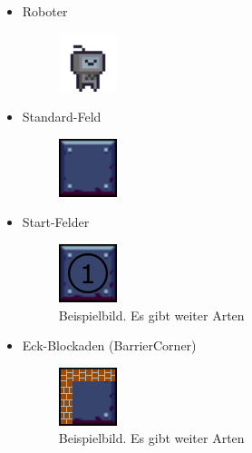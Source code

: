 \documentclass[12pt,a4paper,oneside]{book}
\theoremstyle{plain}
\numberwithin{equation}{chapter} \DeclareMathOperator{\Var}{Var}
\begin{document}
\begin{itemize}
    \item Roboter
    \begin{itemize}
        \begin{figure}[h]
            \centering
            \includegraphics{assets/robot.png}
            \label{StandardFeld}
        \end{figure}
    \end{itemize}

    \item Standard-Feld
    \begin{itemize}
        \begin{figure}[h]
            \centering
            \includegraphics{assets/StandardField/StandardField.png}
            \label{StandardFeld}
        \end{figure}
    \end{itemize}
    
    \item Start-Felder
    \begin{itemize}
        \begin{figure}[h]
            \centering
            \includegraphics{assets/StartFields/StartField01.png}
            \caption*{Beispielbild. Es gibt weiter Arten}
            \label{StartFeld}
        \end{figure}
    \end{itemize}
    
    \newpage
    \item Eck-Blockaden (BarrierCorner)
    \begin{itemize}
        \begin{figure}[h]
            \centering
            \includegraphics{assets/BarrierCorner/BarrierCorner01.png}
            \caption*{Beispielbild. Es gibt weiter Arten}
            \label{BarrierCornerFeld}
        \end{figure}
    \end{itemize}
    

\end{itemize}
\end{document}
